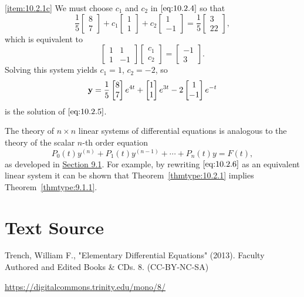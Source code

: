 \documentclass{ximera}
\begin{document}
\begin{example}
\begin{explanation}
\ref{item:10.2.1c}
We must choose $c_1$ and $c_2$ in $\eqref{eq:10.2.4}$ so that
$$
\frac{1}{5}\begin{bmatrix}8\\7\end{bmatrix}+c_1\begin{bmatrix}1\\1\end{bmatrix}+c_2\begin{bmatrix}1\\-1\end{bmatrix}=\frac{1}{5}\begin{bmatrix}3\\22\end{bmatrix},
$$
which is equivalent to
$$
\begin{bmatrix}1&1\\1&-1\end{bmatrix}\begin{bmatrix}c_1\\c_2\end{bmatrix}=\begin{bmatrix}-1\\3\end{bmatrix}.
$$
Solving this system yields $c_1=1$, $c_2=-2$, so
$$
{\bf y}=\frac{1}{5}\begin{bmatrix}8\\7\end{bmatrix}e^{4t}+\begin{bmatrix}1\\1\end{bmatrix}e^{3t}-2\begin{bmatrix}1\\-1\end{bmatrix}e^{-t}
$$
is the solution of  $\eqref{eq:10.2.5}$.
\end{explanation}
\end{example}


\begin{remark}The theory of $n\times n$ linear systems of differential
equations is analogous to the theory of the scalar $n$-th order
equation
\begin{equation} \label{eq:10.2.6}
P_0(t)y^{(n)}+P_1(t)y^{(n-1)}+\cdots+P_n(t)y=F(t),
\end{equation}
as
developed in \href{https://xerxes.ximera.org/differentialequations/main/linearHigherOrder/linearHigherOrder}{Section 9.1}. For example, by rewriting
$\eqref{eq:10.2.6}$ as an equivalent linear system it can be shown that
Theorem~\ref{thmtype:10.2.1} implies Theorem~\ref{thmtype:9.1.1}.
\end{remark}




\section*{Text Source}
Trench, William F., "Elementary Differential Equations" (2013). Faculty Authored and Edited Books \& CDs. 8. (CC-BY-NC-SA)

\href{https://digitalcommons.trinity.edu/mono/8/}{https://digitalcommons.trinity.edu/mono/8/}
\end{document}
